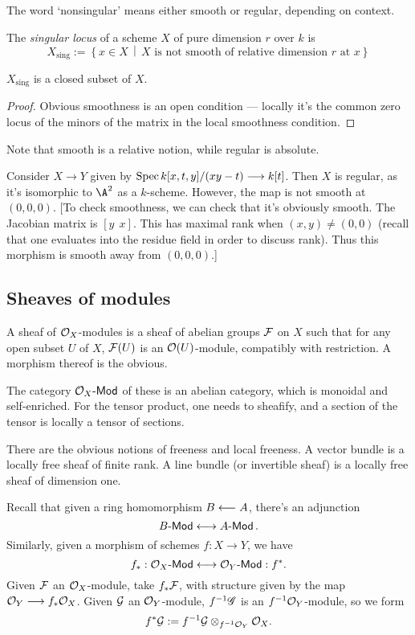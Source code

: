 \documentclass[11pt]{article}
\begin{document}
\begin{Oct27}
\begin{defn*}
The word `nonsingular' means either smooth or regular, depending on context.
\end{defn*}
\begin{defn*}
The \emph{singular locus} of a scheme $X$ of pure dimension $r$ over $k$ is
\[X_{\text{sing}}:=\left\{x\in X\,\middle|\,X\text{ is not smooth of relative dimension $r$ at $x$}\right\}\]
\end{defn*}
\begin{prop*}
$X_{\text{sing}}$ is a closed subset of $X$.
\end{prop*}
\begin{proof}
Obvious smoothness is an open condition --- locally it's the common zero locus of the minors of the matrix in the local smoothness condition.
\end{proof}
Note that smooth is a relative notion, while regular is absolute.
\begin{exmp*}
Consider $X\to Y$ given by $\operatorname{Spec} k[x,t,y]/(xy-t)\longrightarrow k[t]$. Then $X$ is regular, as it's isomorphic to $\A^2$ as a $k$-scheme. However, the map is not smooth at $(0,0,0)$. [To check smoothness, we can check that it's obviously smooth. The Jacobian matrix is $[y\ \ x]$. This has maximal rank when $(x,y)\neq(0,0)$ (recall that one evaluates into the residue field in order to discuss rank). Thus this morphism is smooth away from $(0,0,0)$.]
\end{exmp*}
\subsection*{Sheaves of modules}
\begin{defn*} A sheaf of $\mathcal{O}_X$-modules is a sheaf of abelian groups $\mathcal{F}$ on $X$ such that for any open subset $U$ of $X$, $\mathcal{F}(U)$ is an $\mathcal{O}(U)$-module, compatibly with restriction. A morphism thereof is the obvious.
\end{defn*}
The category $\mathcal{O}_X\operatorname{{\mathsf{\!-Mod}}}$ of these is an abelian category, which is monoidal and self-enriched. For the tensor product, one needs to sheafify, and a section of the tensor is locally a tensor of sections.

There are the obvious notions of freeness and local freeness. A vector bundle is a locally free sheaf of finite rank. A line bundle (or invertible sheaf) is a locally free sheaf of dimension one.

Recall that given a ring homomorphism $B\longleftarrow A$, there's an adjunction
\[B\operatorname{{\mathsf{\!-Mod}}}\longleftrightarrow A\operatorname{{\mathsf{\!-Mod}}}.\]
Similarly, given a morphism of schemes $f:X\to Y$, we have
\[f_*:\mathcal{O}_X\operatorname{{\mathsf{\!-Mod}}}\longleftrightarrow\mathcal{O}_Y\operatorname{{\mathsf{\!-Mod}}}:f^*.\]
Given $\mathcal{F}$ an $\mathcal{O}_X$-module, take $f_*\mathcal{F}$, with structure given by the map $\mathcal{O}_Y\longrightarrow f_*\mathcal{O}_X$. Given $\mathcal{G}$ an $\mathcal{O}_Y$-module, $f^{-1}\mathscr{G}$ is an $f^{-1}\mathcal{O}_Y$-module, so we form
\[f^*\mathcal{G}:=f^{-1}\mathcal{G}\otimes_{f^{-1}{\mathcal{O}_Y}}\mathcal{O}_X.\]
\end{Oct27}
\end{document}

